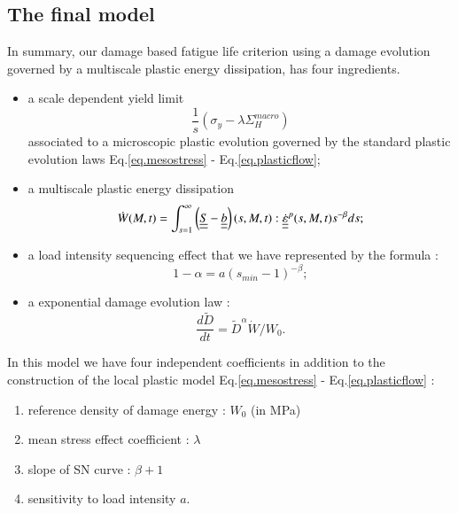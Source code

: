 \documentclass[3p,times,number,review]{elsarticle}
\begin{document}
\newpage
\subsection{The final model}
In summary, our damage based fatigue life criterion using a damage evolution governed by a multiscale plastic energy dissipation, has four ingredients.
\begin{itemize}
\item  a scale dependent yield limit $$\frac{1}{s} (\sigma_y- \lambda \Sigma_H^{macro})$$ associated to a microscopic plastic evolution governed by the standard plastic evolution laws Eq.\eqref{eq.mesostress} - Eq.\eqref{eq.plasticflow};

\vspace{6pt}	

\item a multiscale plastic energy dissipation
\begin{equation}
\dot{W}(M,t)=\int_{s=1}^{\infty}\left(\uline{\uline{S}}-\uline{\uline{b}} \right) (s,M,t):\uline{\uline{\dot{\varepsilon}}}^p(s,M,t) s^{-\beta}ds;
\label{eq.final2}
\end{equation}

\vspace{6pt}	

\item a load intensity sequencing effect that we have represented by the formula : 
\begin{equation}
1 - \alpha = a (s_{min}-1)^{- \beta};
\label{eq.final3}
\end{equation}

\vspace{6pt}	

\item a exponential damage evolution law : 
\begin{equation}
\dfrac{d\tilde{D}}{dt} ={\tilde{D}}^\alpha \dot{W}/W_0.
\label{eq.final4}
\end{equation}
\end{itemize}

In this model we have four independent coefficients in addition to the construction of the local plastic model Eq.\eqref{eq.mesostress} - Eq.\eqref{eq.plasticflow} :

\begin{enumerate}
\item reference density of damage energy : $W_0$ (in MPa)

\item mean stress effect coefficient : $\lambda$

\item slope of SN curve : $\beta+1$

\item sensitivity to load intensity $a$. 
\end{enumerate}
\end{document}
